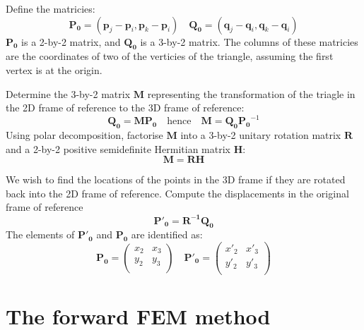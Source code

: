 \documentclass{article}
\renewcommand{\vec}[1]{\mathbf{#1}}
\begin{document}
Define the matricies:
\begin{displaymath}
  \vec{P_0} = \left(\vec{p}_j-\vec{p}_i, \vec{p}_k-\vec{p}_i\right) \quad
  \vec{Q_0} = \left(\vec{q}_j-\vec{q}_i, \vec{q}_k-\vec{q}_i\right)    
\end{displaymath}
$\vec{P_0}$ is a 2-by-2 matrix, and $\vec{Q_0}$ is a 3-by-2
matrix. The columns of these matricies are the coordinates of two of
the verticies of the triangle, assuming the first vertex is at the
origin.

Determine the 3-by-2 matrix $\vec{M}$ representing the transformation
of the triagle in the 2D frame of reference to the 3D frame of
reference:
\begin{displaymath}
  \vec{Q_0} = \vec{M}\vec{P_0} \quad \mbox{hence} \quad
  \vec{M} = \vec{Q_0}\vec{P_0}^{-1}
\end{displaymath}
Using polar decomposition, factorise $\vec{M}$ into a 3-by-2 unitary
rotation matrix $\vec{R}$ and a 2-by-2 positive semidefinite Hermitian
matrix $\vec{H}$:
\begin{displaymath}
  \vec{M} = \vec{R}\vec{H}
\end{displaymath}

We wish to find the locations of the points in the 3D frame if they
are rotated back into the 2D frame of reference. 
Compute the displacements in the original frame of reference
\begin{displaymath}
  \vec{P'_0} = \vec{R^{-1}}\vec{Q_0} 
\end{displaymath}
The elements of $\vec{P'_0}$ and $\vec{P_0}$ are identified as:
\begin{displaymath}
  \vec{P_0} =  
  \begin{pmatrix} 
    x_2 & x_3 \\
    y_2 & y_3 \\
  \end{pmatrix}
  \quad
  \vec{P'_0} =  
  \begin{pmatrix} 
    x'_2 & x'_3 \\
    y'_2 & y'_3 \\
  \end{pmatrix}
\end{displaymath}



\section{The forward FEM method}
\label{fem2:sec:forward-fem-method}
\end{document}
